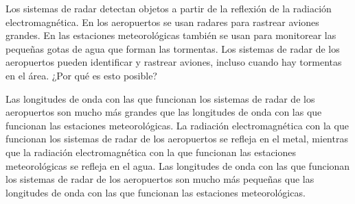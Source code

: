Los sistemas de radar detectan objetos a partir de la reflexión de la
radiación electromagnética. En los aeropuertos se usan radares para rastrear
aviones grandes. En las estaciones meteorológicas también se usan para
monitorear las pequeñas gotas de agua que forman las tormentas.
Los sistemas de radar de los aeropuertos pueden identificar y rastrear
aviones, incluso cuando hay tormentas en el área. ¿Por qué es esto posible?

\begin{choices}
    \CorrectChoice Las longitudes de onda con las que funcionan los sistemas de radar de
    los aeropuertos son mucho más grandes que las longitudes de onda con las que
    funcionan las estaciones meteorológicas.
    \choice La radiación electromagnética con la que funcionan los sistemas de
    radar de los aeropuertos se refleja en el metal, mientras que la radiación
    electromagnética con la que funcionan las estaciones meteorológicas se refleja
    en el agua.
    \choice Las longitudes de onda con las que funcionan los sistemas de radar de
    los aeropuertos son mucho más pequeñas que las longitudes de onda con las que
    funcionan las estaciones meteorológicas.
\end{choices}